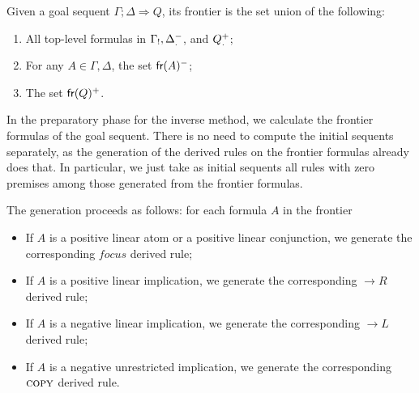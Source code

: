 \begin{definition}[Frontier]
  Given a goal sequent $\Gamma;\Delta \Longrightarrow Q$, its frontier is the
  set union of the following:

  \begin{enumerate}
  \item All top-level formulas in $\Gamma_!,
    \Delta_.^-$, and $Q_.^+$;
  \item For any $A \in \Gamma, \Delta$, the set $\textsf{fr}(A)^-$;
  \item The set $\textsf{fr}(Q)^+$.
  \end{enumerate}
\end{definition}

In the preparatory phase for the inverse method, we calculate the frontier
formulas of the goal sequent. There is no need to compute the initial sequents
separately, as the generation of the derived rules on the frontier formulas
already does that. In particular, we just take as initial sequents all rules
with zero premises among those generated from the frontier formulas.

The generation proceeds as follows: for each formula $A$ in the frontier

\begin{itemize}
\item If $A$ is a positive linear atom or a positive linear conjunction, we
  generate the corresponding $focus$ derived rule;
\item If $A$ is a positive linear implication, we generate the corresponding
  $\rightarrow R$ derived rule;
\item If $A$ is a negative linear implication, we generate the corresponding
  $\rightarrow L$ derived rule;
\item If $A$ is a negative unrestricted implication, we generate the
  corresponding $\textsc{copy}$ derived rule.
\end{itemize}


